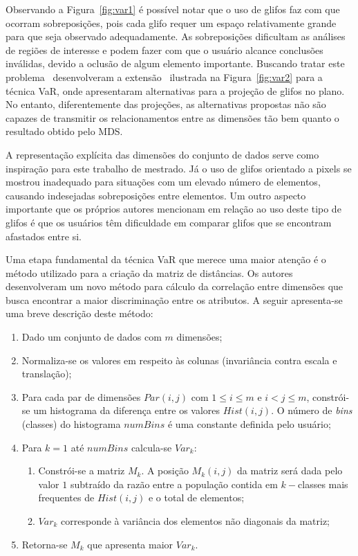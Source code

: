 Observando a Figura~\ref{fig:var1} é possível notar que o uso de glifos faz com que ocorram sobreposições, pois cada glifo requer um espaço relativamente grande para que seja observado adequadamente. As sobreposições dificultam as análises de regiões de interesse e podem fazer com que o usuário alcance conclusões inválidas, devido a oclusão de algum elemento importante. Buscando tratar este problema~\citeauthor{Yang2007} desenvolveram a extensão~\cite{Yang2007} ilustrada na Figura~\ref{fig:var2} para a técnica VaR, onde apresentaram alternativas para a projeção de glifos no plano. No entanto, diferentemente das projeções, as alternativas propostas não são capazes de transmitir os relacionamentos entre as dimensões tão bem quanto o resultado obtido pelo MDS.

A representação explícita das dimensões do conjunto de dados serve como inspiração para este trabalho de mestrado. Já o uso de glifos orientado a pixels se mostrou inadequado para situações com um elevado número de elementos, causando indesejadas sobreposições entre elementos. Um outro aspecto importante que os próprios autores mencionam em relação ao uso deste tipo de  glifos é que os usuários têm dificuldade em comparar glifos que se encontram afastados entre si. 

Uma etapa fundamental da técnica VaR que merece uma maior atenção é o método utilizado para a criação da matriz de distâncias. Os autores desenvolveram um novo método para cálculo da correlação entre dimensões que busca encontrar a maior discriminação entre os atributos. A seguir apresenta-se uma breve  descrição deste método:

\begin{enumerate}
   
    \item Dado um conjunto de dados com $m$ dimensões; 
    \item Normaliza-se os valores em respeito às colunas (invariância contra escala e translação);
    \item Para cada par de dimensões $Par(i,j)$ com $1 \leq i \leq m$ e $i < j \leq m$, constrói-se um histograma da diferença entre os valores $Hist(i,j)$. O número de \emph{bins} (classes) do histograma $numBins$ é uma constante definida pelo usuário;
    \item Para $k = 1$ até $numBins$ calcula-se $Var_k$:
    \begin{enumerate}
        \item Constrói-se a matriz $M_k$. A posição $M_k(i,j)$ da matriz será dada pelo valor $1$ subtraído da razão entre a população contida em $k-$classes mais frequentes de $Hist(i,j)$ e o total de elementos;
        \item $Var_k$ corresponde à variância dos elementos não diagonais da matriz;
    \end{enumerate}
\item Retorna-se $M_k$ que apresenta maior $Var_k$.

\end{enumerate}

